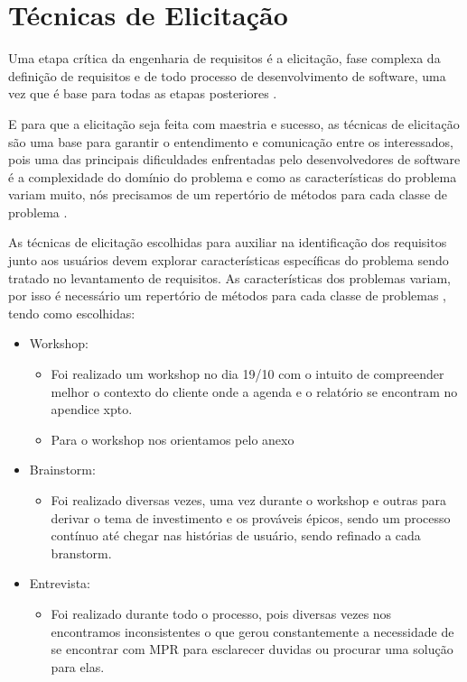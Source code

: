 \chapter[Técnicas de Elicitação]{Técnicas de Elicitação}

Uma etapa crítica da engenharia de requisitos é a elicitação, fase complexa da definição de requisitos e de todo processo de desenvolvimento de software, uma vez que é base para todas as etapas posteriores \cite{BELGAMO}.
	
E para que a elicitação seja feita com maestria e sucesso, as técnicas de elicitação são uma base para garantir o entendimento e comunicação entre os interessados, pois  uma das principais dificuldades enfrentadas pelo desenvolvedores de software é a complexidade do domínio do problema \cite{BOOCH} e como as características do problema variam muito, nós precisamos de um repertório de métodos para cada classe de problema \cite{SIDDIQI}. 

As técnicas de elicitação escolhidas para auxiliar na identificação dos requisitos junto aos usuários devem explorar características específicas do problema sendo tratado no levantamento de requisitos. As características dos problemas variam, por isso é necessário um repertório de métodos para cada classe de problemas \cite{BELGAMO}, tendo como escolhidas:

\begin{itemize}
	\item Workshop:
		\begin{itemize}
			\item Foi realizado um workshop no dia 19/10 com o intuito de compreender melhor o contexto do cliente onde a agenda e o relatório se encontram no apendice xpto.
			\item Para o workshop nos orientamos pelo anexo %
		\end{itemize}

	\item Brainstorm:
		\begin{itemize}
			\item Foi realizado diversas vezes, uma vez durante o workshop e outras para derivar o tema de investimento e os prováveis épicos, sendo um processo contínuo até chegar nas histórias de usuário, sendo refinado a cada branstorm.
		\end{itemize}

	\item Entrevista:
		\begin{itemize}
			\item Foi realizado durante todo o processo, pois diversas vezes nos encontramos inconsistentes o que gerou constantemente a necessidade de se encontrar com MPR para esclarecer duvidas ou procurar uma solução para elas.
		\end{itemize}
\end{itemize}
